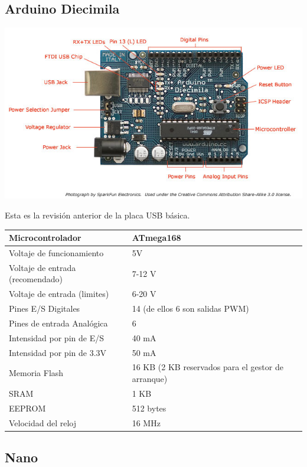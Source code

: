 \documentclass[12pt,a4paper]{report}
\begin{document}
\subsection{Arduino Diecimila}

\includegraphics[scale=0.6]{ArduinoDiecimilaComponents.jpg}

 Esta es la revisión anterior de la placa USB básica. 

\begin{tabular}{||l | l ||}
\hline
\hline
Microcontrolador & ATmega168\\
\hline
Voltaje de funcionamiento & 5V\\
\hline
Voltaje de entrada (recomendado) & 7-12 V\\
\hline
Voltaje de entrada (limites) & 6-20 V\\
\hline
Pines E/S Digitales & 14 (de ellos 6 son salidas PWM)\\
\hline
Pines de entrada Analógica & 6\\
\hline
Intensidad por pin de E/S & 40 mA\\
\hline
Intensidad por pin de 3.3V & 50 mA\\
\hline
Memoria Flash & 16 KB (2 KB reservados para el gestor de arranque)\\
\hline
SRAM & 1 KB\\
\hline
EEPROM & 512 bytes\\
\hline
Velocidad del reloj & 16 MHz\\
\hline
\hline
\end{tabular}

\subsection{Nano}
\end{document}
